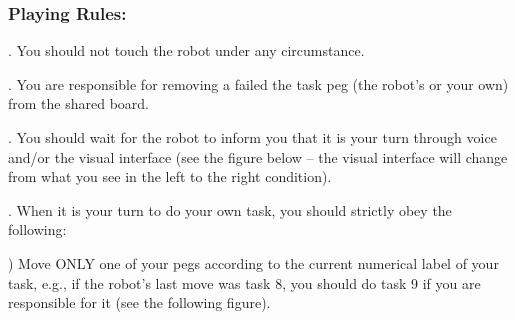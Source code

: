 \documentclass[12pt]{report}
\begin{document}
\begin{appendices}
\begin{figure}[tbh]
    \centering
    \qquad
    \label{fig:peg-instruction}%
\end{figure}

\vspace*{-5mm}
\subsubsection{Playing Rules:}

. You should not touch the robot under any circumstance.

. You are responsible for removing a failed the task peg (the robot's
or your own) from the shared board.

. You should wait for the robot to inform you that it is your turn
through voice and/or the visual interface (see the figure below – the visual
interface will change from what you see in the left to the right condition).

. When it is your turn to do your own task, you should strictly obey
the following:

) Move ONLY one of your pegs according to the current numerical
label of your task, e.g., if the robot's last move was task 8, you should do
task 9 if you are responsible for it (see the following figure).


\end{appendices}
\end{document}
